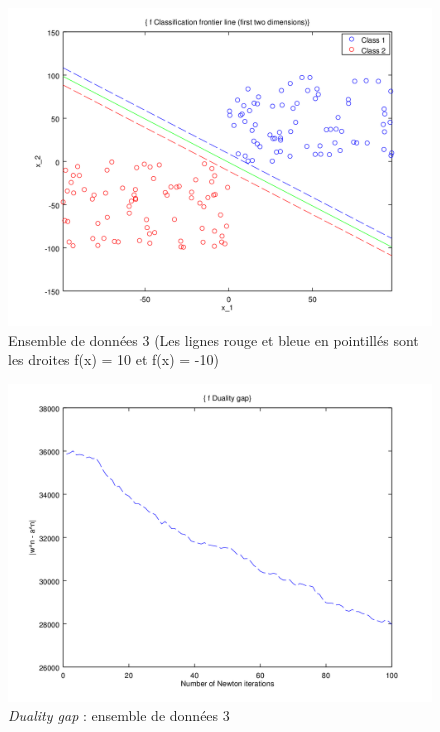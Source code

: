 \documentclass{article}
\begin{document}
         \begin{figure}[H]
           \begin{center}
             \includegraphics[scale=0.5]{images/line33.png}
             \caption{Ensemble de données 3 (Les lignes rouge et bleue en pointillés sont les droites f(x) = 10 et f(x) = -10)}
           \end{center}
         \end{figure}

         \begin{figure}[H]
           \begin{center}
             \includegraphics[scale=0.5]{images/duality33.png}
             \caption{\emph{Duality gap} : ensemble de données 3}
           \end{center}
         \end{figure}
\end{document}
